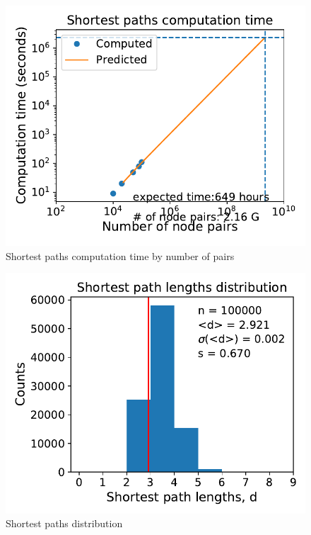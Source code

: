 \documentclass[11pt, twoside]{report}
\begin{document}
\begin{minipage}[b]{0.5\textwidth}
   \centering
    \begin{figure}[H]
      \includegraphics[width=\textwidth]{../../scripts/network_analysis/imgs/paths_computation_time.pdf}
          \caption{Shortest paths computation time by number of pairs}
      \label{fig:path_time}
\end{figure}
\end{minipage}
\begin{minipage}[b]{0.5\textwidth}
  \begin{figure}[H]
  \centering
      \includegraphics[width=\textwidth]{../../scripts/network_analysis/imgs/paths_hist.pdf}
        \caption{Shortest paths distribution}
\end{figure}
\end{minipage}
\end{document}
